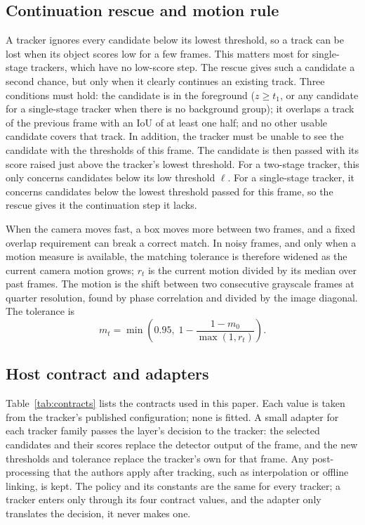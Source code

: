 \subsection{Continuation rescue and motion rule}\label{sec:rescue}
A tracker ignores every candidate below its lowest threshold, so a track
can be lost when its object scores low for a few frames. This matters most
for single-stage trackers, which have no low-score step. The rescue gives
such a candidate a second chance, but only when it clearly continues an
existing track. Three conditions must hold: the candidate is in the
foreground ($z\ge t_1$, or any candidate for a single-stage tracker when
there is no background group); it overlaps a track of the previous frame
with an IoU of at least one half; and no other usable candidate covers that
track. In addition, the tracker must be unable to see the candidate with the
thresholds of this frame. The candidate is then passed with its score raised just above
the tracker's lowest threshold. For a two-stage tracker, this only concerns
candidates below its low threshold $\ell$. For a single-stage tracker, it
concerns candidates below the lowest threshold passed for this frame, so the rescue gives it the
continuation step it lacks.

When the camera moves fast, a box moves more between two frames, and a
fixed overlap requirement can break a correct match. In noisy frames, and
only when a motion measure is available, the matching tolerance is
therefore widened as the current camera motion grows; $r_t$ is the current
motion divided by its median over past frames. The motion is the shift between two
consecutive grayscale frames at quarter resolution, found by phase
correlation \cite{reddy1996phasecorr} and divided by the image diagonal.
The tolerance is
\begin{equation}
m_t=\min\!\left(0.95,\;1-\frac{1-m_0}{\max(1,r_t)}\right).
\label{eq:motion}
\end{equation}

\subsection{Host contract and adapters}\label{sec:contract}
Table~\ref{tab:contracts} lists the contracts used in this paper. Each
value is taken from the tracker's published configuration; none is fitted.
A small adapter for each tracker family passes the layer's decision to the
tracker: the selected candidates and their scores replace the detector
output of the frame, and the new thresholds and tolerance replace the
tracker's own for that frame. Any post-processing that the authors apply
after tracking, such as interpolation or offline linking, is kept. The
policy and its constants are the same for every tracker; a tracker enters
only through its four contract values, and the adapter only translates the
decision, it never makes one.

